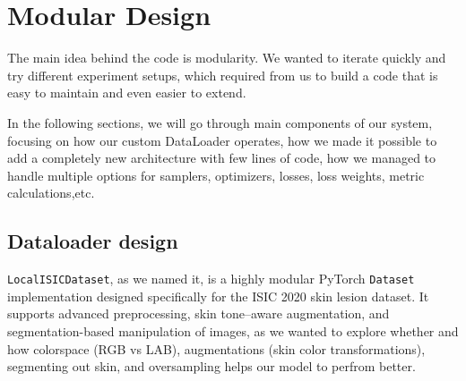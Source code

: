\section{Modular Design}
The main idea behind the code is modularity. We wanted to iterate quickly and try different experiment setups, which required from us to build a code that is easy to maintain and even easier to extend.

In the following sections, we will go through main components of our system, focusing on how our custom DataLoader operates, how we made it possible to add a completely new architecture with few lines of code, how we managed to handle multiple options for samplers,  optimizers, losses, loss weights, metric calculations,etc. 

\subsection{Dataloader design}
\texttt{LocalISICDataset}, as we named it, is a highly modular PyTorch \texttt{Dataset} implementation designed specifically for the ISIC 2020 skin lesion dataset. It supports advanced preprocessing, skin tone–aware augmentation, and segmentation-based manipulation of images, as we wanted to explore whether and how colorspace (RGB vs LAB), augmentations (skin color transformations), segmenting out skin, and oversampling helps our model to perfrom better. 


